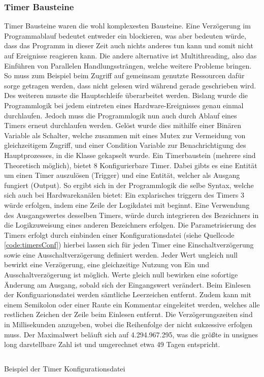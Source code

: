 \subsubsection{Timer Bausteine}\label{kap:ums:timerchannel}
Timer Bausteine waren die wohl komplexesten Bausteine. Eine Verzögerung im Programmablauf bedeutet entweder ein blockieren, was aber bedeuten würde, dass das Programm in dieser Zeit auch nichts anderes tun kann und somit nicht auf Ereignisse reagieren kann. Die andere alternative ist Multithreading, also das Einführen von Parallelen Handlungssträngen, welche weitere Probleme bringen. So muss zum Beispiel beim Zugriff auf gemeinsam genutzte Ressourcen dafür sorge getragen werden, dass nicht gelesen wird während gerade geschrieben wird. Des weiteren musste die Hauptschleife überarbeitet werden. Bislang wurde die Programmlogik bei jedem eintreten eines Hardware-Ereignisses genau einmal durchlaufen. Jedoch muss die Programmlogik nun auch durch Ablauf eines Timers erneut durchlaufen werden. Gelöst wurde dies mithilfe einer Binären Variable als Schalter, welche zusammen mit eines Mutex zur Vermeidung von gleichzeitigem Zugriff, und einer Condition Variable zur Benachrichtigung des Hauptprozesses, in die Klasse  gekapselt wurde. 
Ein Timerbaustein (mehrere sind Theoretisch möglich), bietet 8 Konfigurierbare Timer. Dabei gibts es eine Entität um einen Timer auszulösen  (Trigger) und eine Entität, welcher als Ausgang fungiert  (Output). So ergibt sich in der Programmlogik die selbe Syntax, welche sich auch bei Hardwarekanälen bietet: Ein explarisches triggern des Timers 3 würde erfolgen, indem eine Zeile der Logikdatei mit  beginnt. Eine Verwendung des Ausgangswertes desselben Timers, würde durch integrieren des Bezeichners \chphl{[To3]} in die Logikzuweisung eines anderen Bezeichners erfolgen. Die Parametrisierung des Timers erfolgt durch einbinden einer Konfigurationsdatei (siehe Quellcode \ref{code:timersConf}) hierbei lassen sich für jeden Timer eine Einschaltverzögerung sowie eine Ausschaltverzögerung definiert werden. Jeder Wert ungleich null bewirkt eine Verzögerung, eine gleichzeitige Nutzung von Ein und Ausschaltverzögerung ist möglich. Werte gleich null bewirken eine sofortige Änderung am Ausgang, sobald sich der Eingangswert verändert. Beim Einlesen der Konfiguarionsdatei werden sämtliche Leerzeichen entfernt. Zudem kann mit einem Semikolon \chphl{;} oder einer Raute \chphl{\#} ein Kommentar eingeleitet werden, welches alle restlichen Zeichen der Zeile beim Einlesen entfernt. Die Verzögerungszeiten sind in Millisekunden anzugeben, wobei die Reihenfolge der nicht sukzessive erfolgen muss. Der Maximalwert beläuft sich auf 4.294.967.295, was die größte in unsignes long darstellbare Zahl ist und umgerechnet etwa 49 Tagen entspricht. 
\begin{listing}[H]
	\inputminted[numbersep=1pt,fontsize=\scriptsize,frame=single, firstline=14,lastline=25]{c}{./code/timers.conf}
	\caption{Beispiel der Timer Konfigurationsdatei}
	\label{code:timersConf}
\end{listing}


